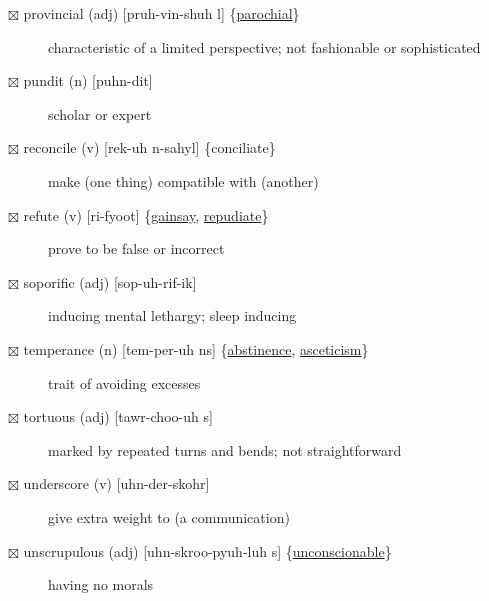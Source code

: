 \documentclass[11pt]{article}
\begin{document}
\begin{description}
\item[{$\boxtimes$ \label{org4804e7c}provincial (adj) [pruh-vin-shuh l] \{\hyperref[org3c9f40a]{parochial}\}}] characteristic of a limited perspective; not fashionable or sophisticated
\item[{$\boxtimes$ pundit (n) [puhn-dit]}] scholar or expert
\item[{$\boxtimes$ reconcile (v) [rek-uh n-sahyl] \{conciliate\}}] make (one thing) compatible with (another)
\item[{$\boxtimes$ \label{org0b4ccdf}refute (v) [ri-fyoot] \{\hyperref[orgc771101]{gainsay}, \hyperref[org1211120]{repudiate}\}}] prove to be false or incorrect
\item[{$\boxtimes$ soporific (adj) [sop-uh-rif-ik]}] inducing mental lethargy; sleep inducing
\item[{$\boxtimes$ \label{orgddf8c21} temperance (n) [tem-per-uh ns] \{\hyperref[orge3e83e1]{abstinence}, \hyperref[org0c3a606]{asceticism}\}}] trait of avoiding excesses
\item[{$\boxtimes$ tortuous (adj) [tawr-choo-uh s]}] marked by repeated turns and bends; not straightforward
\item[{$\boxtimes$ underscore (v) [uhn-der-skohr]}] give extra weight to (a communication)
\item[{$\boxtimes$ \label{orgaf1efd8}unscrupulous (adj) [uhn-skroo-pyuh-luh s] \{\hyperref[org23bc9ff]{unconscionable}\}}] having no morals
\end{description}
\end{document}
